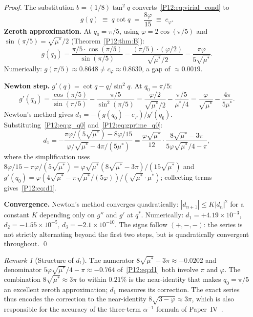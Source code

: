 \documentclass[11pt,a4paper]{article}
\theoremstyle{definition}
\theoremstyle{remark}
\newtheorem{remark}[theorem]{Remark}
\newcommand{\vp}{\varphi}
\newcommand{\ms}{\mu^{*}}
\begin{document}
\begin{proof}
The substitution $b=(1/8)\tan^2 q$ converts~\eqref{P12:eq:virial_cond} to
\begin{equation}
  g(q) \;\equiv\; q\cot q \;=\; \frac{8\vp}{15} \;\equiv\; c_\vp.
  \label{P12:eq:gcot}
\end{equation}
\textbf{Zeroth approximation.}
At $q_0=\pi/5$, using $\vp=2\cos(\pi/5)$ and $\sin(\pi/5)=\sqrt{\ms}/2$
(Theorem~\ref{P12:thm:B}):
\begin{equation}
  g(q_0) = \frac{\pi/5\cdot\cos(\pi/5)}{\sin(\pi/5)}
  = \frac{(\pi/5)\cdot(\vp/2)}{\sqrt{\ms}/2}
  = \frac{\pi\vp}{5\sqrt{\ms}}.
  \label{P12:eq:g_q0}
\end{equation}
Numerically: $g(\pi/5)\approx0.8648\neq c_\vp\approx0.8630$,
a gap of $\approx0.0019$.

\textbf{Newton step.}
$g'(q) = \cot q - q/\sin^2 q$.
At $q_0=\pi/5$:
\begin{equation}
  g'(q_0)
  = \frac{\cos(\pi/5)}{\sin(\pi/5)} - \frac{\pi/5}{\sin^2(\pi/5)}
  = \frac{\vp/2}{\sqrt{\ms}/2} - \frac{\pi/5}{\ms/4}
  = \frac{\vp}{\sqrt{\ms}} - \frac{4\pi}{5\ms}.
  \label{P12:eq:gprime_q0}
\end{equation}
Newton's method gives $d_1 = -(g(q_0)-c_\vp)/g'(q_0)$.
Substituting~\eqref{P12:eq:g_q0} and~\eqref{P12:eq:gprime_q0}:
\begin{equation}
  d_1
  = -\frac{\pi\vp/(5\sqrt{\ms}) - 8\vp/15}
          {\vp/\sqrt{\ms} - 4\pi/(5\ms)}
  = \frac{\vp\sqrt{\ms}}{12}\cdot
    \frac{8\sqrt{\ms}-3\pi}{5\vp\sqrt{\ms}/4-\pi},
  \label{P12:eq:d1_derived}
\end{equation}
where the simplification uses $8\vp/15 - \pi\vp/(5\sqrt{\ms}) = \vp\sqrt{\ms}(8\sqrt{\ms}-3\pi)/(15\sqrt{\ms})$
and $g'(q_0) = \vp(4\sqrt{\ms}-\pi\sqrt{\ms}/(5\vp))/(\sqrt{\ms}\cdot\ms)$; collecting terms gives~\eqref{P12:eq:d1}.

\textbf{Convergence.}
Newton's method converges quadratically:
$|d_{n+1}|\leq K|d_n|^2$ for a constant $K$ depending only on $g''$ and $g'$ at $q^*$.
Numerically: $d_1=+4.19\times10^{-3}$, $d_2=-1.55\times10^{-5}$,
$d_3=-2.1\times10^{-10}$. The signs follow $(+,-,-)$: the series is not
strictly alternating beyond the first two steps, but is quadratically
convergent throughout.
\qed
\end{proof}

\begin{remark}[Structure of $d_1$]
\label{P12:rem:d1_structure}
The numerator $8\sqrt{\ms}-3\pi\approx-0.0202$ and denominator
$5\vp\sqrt{\ms}/4-\pi\approx-0.764$ of~\eqref{P12:eq:d1}
both involve $\pi$ and $\vp$.
The combination $8\sqrt{\ms}\approx3\pi$ to within $0.21\%$
is the near-identity that makes $q_0=\pi/5$ an excellent zeroth
approximation; $d_1$ measures its correction.
The exact series thus encodes the correction to the near-identity
$8\sqrt{3-\vp}\approx3\pi$, which is also responsible for the
accuracy of the three-term $\alpha^{-1}$ formula of Paper~IV~\cite{Paper4}.
\end{remark}
\end{document}

